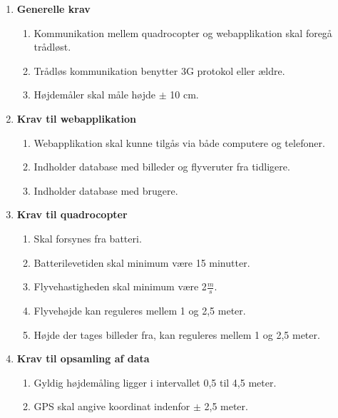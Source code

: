 \begin{enumerate}
\item \textbf{Generelle krav}
	\begin{enumerate}[label*=\arabic*.]
	\item Kommunikation mellem quadrocopter og webapplikation skal foregå trådløst.
	\item Trådløs kommunikation benytter 3G protokol eller ældre. 
	\item Højdemåler skal måle højde $\pm$ 10 cm.\\
	\end{enumerate}

\item \textbf{Krav til webapplikation}
	\begin{enumerate}[label*=\arabic*.]
	\item Webapplikation skal kunne tilgås via både computere og telefoner.
	\item Indholder database med billeder og flyveruter fra tidligere.
	\item Indholder database med brugere.\\
	\end{enumerate}	
	

\item \textbf{Krav til quadrocopter}
	\begin{enumerate}[label*=\arabic*.]
	\item Skal forsynes fra batteri.
	\item Batterilevetiden skal minimum være 15 minutter.
	\item Flyvehastigheden skal minimum være 2$\frac{m}{s}$.
	\item Flyvehøjde kan reguleres mellem 1 og 2,5 meter.
	\item Højde der tages billeder fra, kan reguleres mellem 1 og 2,5 meter.\\
	
	\end{enumerate}
	
\item \textbf{Krav til opsamling af data}
	\begin{enumerate} [label*=\arabic*.]
	\item Gyldig højdemåling ligger i intervallet 0,5 til 4,5 meter. 
	\item GPS skal angive koordinat indenfor $\pm$ 2,5 meter.
	\end{enumerate}
\end{enumerate}